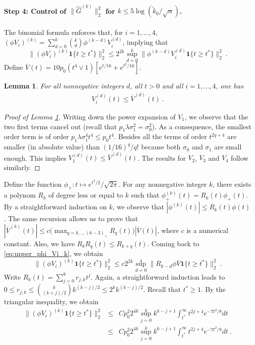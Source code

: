 \documentclass[twoside,11pt]{article}
\newtheorem{lem}{Lemma}
\def\beq{\begin{equation}}
\def\eeq{\end{equation}}
\def\beqn{\begin{eqnarray*}}
\def\eeqn{\end{eqnarray*}}
\newcommand{\<}{\langle}
\renewcommand{\>}{\rangle}
\begin{document}
\paragraph{Step 4: Control of $\|\widehat{G}^{(k)}\|_2^2$ for $k\leq  5\log(\tilde{k}_0/\sqrt{n})$.} The  binomial formula enforces that, for $i=1,\ldots,4$, $(\phi  V_i)^{(k)} = \sum_{d=0}^k \binom{k}{d} \phi^{(k-d)} V_i^{(d)}$, implying that 
\beq\label{eq:upper_phi_Vi_k}
\|(\phi  V_i)^{(k)} \mathbf 1\{t \geq t^*\}\|_2^2 \leq 2^{2k} \sup_{d=0}^k\|\phi^{(k-d)} V_i^{(d)} \mathbf 1\{t \geq t^*\}\|_2^2\ .
\eeq 
Define $\overline{V}(t)= 10p_0 (t^4\vee 1)[e^{t/16}+ e^{t^2/16}]$.
\begin{lem}\label{lem:upper_Vi}
 For all nonnegative integers $d$, all $t>0$ and all   $i=1,\ldots, 4$, one has 
\beqn 
V_i^{(d)}(t)\leq \overline{V}^{(d)}(t)\ . 
\eeqn
\end{lem}
\begin{proof}[Proof of Lemma \ref{lem:upper_Vi}]
Writing down the power expansion of $V_1$, we observe that the two first terms cancel out (recall that $p_1\lambda\sigma_1^2=  \sigma_0^2$). As a consequence, 
the smallest order term is of order $p_1 \lambda \sigma_1^4 t^4\leq p_0 t^4$. Besides all the terms of order $t^{2q+4}$ are smaller (in absolute value) than $(1/16)^{q}/q!$ because both $\sigma_0$ and $\sigma_1$ are small enough. This implies $V_1^{(d)}(t)\leq \overline{V}^{(d)}(t)$.
 The results for $V_2$, $V_3$ and $V_4$ follow similarly.
\end{proof}
Define the function  $\phi_+: t\mapsto e^{t^2/2}/\sqrt{2\pi}$. For any nonnegative integer $k$, there exists a polynom $R_k$ of degree less or equal to $k$ such that $\phi^{(k)}_{+}(t)= R_k(t)\phi_+(t)$. By a straightforward induction on $k$, we observe that $|\phi^{(k)}(t)|\leq R_k(t) \phi(t)$. The same recursion allows us to prove that $|\overline{V}^{(k)}(t)|\leq c \big(\max_{q=k,..,(k-3)_+} R_q(t)\big) |\overline{V}(t)|$, where $c$ is a numerical constant. Also, we have $R_kR_q(t)\leq R_{k+q}(t)$. Coming back to \eqref{eq:upper_phi_Vi_k}, we obtain 
\[
\|(\phi  V_i)^{(k)} \mathbf 1\{t \geq t^*\}\|_2^2 \leq c 2^{2k} \sup_{d=0}^4\|R_{k-d} \phi \overline{V} \mathbf 1\{t \geq t^*\}\|_2^2\ . 
\]
Write $R_k(t)= \sum_{j=0}^{k} r_{j,k}t^j$. Again, a straightforward induction leads to $0\leq r_{j,k}\leq \binom{k}{(k+j)/2} k^{(k-j)/2}\leq 2^k k^{(k-j)/2}$. Recall that $t^*\geq 1$. By the triangular inequality, we obtain 
\begin{eqnarray}
\|(\phi  V_i)^{(k)} \mathbf 1\{t \geq t^*\}\|_2^2 &\leq& Cp_0^2 2^{4k}\sup_{j=0}^{k} k^{k-j+1}  \int_{t^*}^{\infty }t^{2j+4 } e^{-7t^2/8}dt \nonumber \\
&\leq& Cp_0^2 2^{4k}\sup_{j=0}^{k} k^{k-j+1}  \int_{t^*}^{\infty }t^{2j+4 }  e^{-7t^2/8}dt \ . 
\label{eq:upper_phi_Vi_k2} 
\end{eqnarray}
\end{document}
